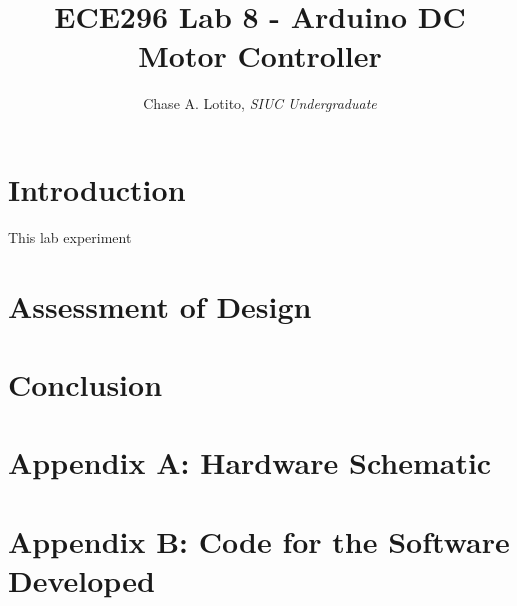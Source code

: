 \documentclass{IEEEtran}
\title{ECE296 Lab 8 - Arduino DC Motor Controller}
\author{Chase A. Lotito, \textit{SIUC Undergraduate}}
\date{}
\begin{document}
\maketitle %

\section{Introduction} 

This lab experiment  

\section{Assessment of Design}

\section{Conclusion}

\section*{Appendix A: Hardware Schematic}

\section*{Appendix B: Code for the Software Developed}
\end{document}
